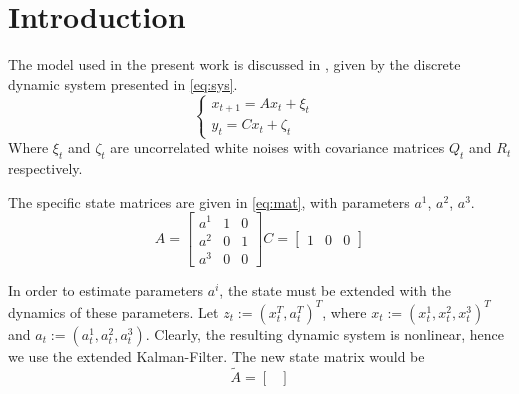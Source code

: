 \section{Introduction}\label{sec:intro}
The model used in the present work is discussed in \cite{wei2017parameter}, given by the discrete dynamic system presented in \cref{eq:sys}.
\begin{equation}\label{eq:sys}
  \begin{cases}
    x_{t+1}=A x_t+\xi_t&\\
    y_{t}=Cx_t + \zeta_t&
  \end{cases}
\end{equation}
Where $\xi_t$ and $\zeta_t$ are uncorrelated white noises with covariance matrices $Q_t$ and $R_t$ respectively.

The specific state matrices are given in \cref{eq:mat}, with parameters $a^1$, $a^2$, $a^3$.
\begin{equation}\label{eq:mat}
A=\begin{bmatrix}
{a^{1}} & {1} & {0} \\
{a^{2}} & {0} & {1} \\
{a^{3}} & {0} & {0}
\end{bmatrix}
C=\begin{bmatrix}{1} & {0} & {0}\end{bmatrix}
\end{equation}

In order to estimate parameters $a^i$, the state must be extended with the dynamics of these parameters. Let $z_t:=(x_t^T, a_t^T)^T$, where $x_t:=(x_t^1,x_t^2,x_t^3)^T$ and $a_t:=(a_t^1,a_t^2,a_t^3)$. Clearly, the resulting dynamic system is nonlinear, hence we use the extended Kalman-Filter. The new state matrix would be
\begin{equation}\label{eq:linmat}
  \tilde{A}=\begin{bmatrix}

  \end{bmatrix}
\end{equation}
